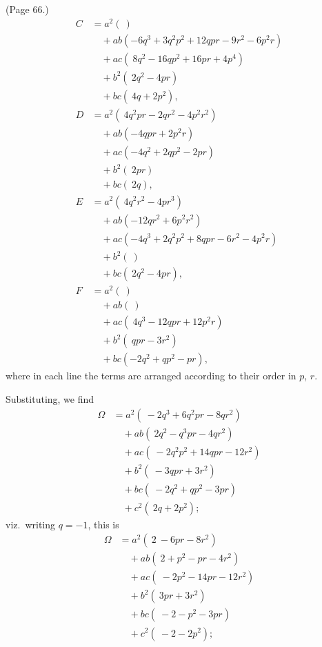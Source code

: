 \documentclass[11pt,a4paper]{article}
\begin{document}
\noindent (Page 66.)
\begin{align*}
C &= a^2 (\ ) \\
 &\quad + ab(-6q^3 + 3q^2 p^2 + 12qpr - 9r^2 - 6p^2 r) \\
 &\quad + ac(\ 8q^2 - 16qp^2 + 16pr + 4p^4) \\
 &\quad + b^2 (\ 2q^2 - 4pr) \\
 &\quad + bc(\ 4q + 2p^2), \\[4pt]
D &= a^2 (\ 4q^2 pr - 2qr^2 - 4p^2 r^2) \\
 &\quad + ab(-4qpr + 2p^2 r) \\
 &\quad + ac(-4q^2 + 2qp^2 - 2pr) \\
 &\quad + b^2 (\ 2pr) \\
 &\quad + bc(\ 2q), \\[4pt]
E &= a^2 (\ 4q^2 r^2 - 4pr^3) \\
 &\quad + ab(-12qr^2 + 6p^2 r^2) \\
 &\quad + ac(-4q^3 + 2q^2 p^2 + 8qpr - 6r^2 - 4p^2 r) \\
 &\quad + b^2 (\ ) \\
 &\quad + bc(\ 2q^2 - 4pr), \\[4pt]
F &= a^2 (\ ) \\
 &\quad + ab(\ ) \\
 &\quad + ac(\ 4q^3 - 12qpr + 12p^2 r) \\
 &\quad + b^2 (\ qpr - 3r^2) \\
 &\quad + bc(-2q^2 + qp^2 - pr),
\end{align*}
where in each line the terms are arranged according to their order in $p$, $r$.

Substituting, we find
\begin{align*}
\Omega &= a^2 (\ -2q^3 + 6q^2 pr - 8qr^2) \\
 &\quad + ab(\ 2q^2 - q^3 pr - 4qr^2) \\
 &\quad + ac(\ -2q^2 p^2 + 14qpr - 12r^2) \\
 &\quad + b^2 (\ -3qpr + 3r^2) \\
 &\quad + bc(\ -2q^2 + qp^2 - 3pr) \\
 &\quad + c^2 (\ 2q + 2p^2);
\end{align*}
viz.\ writing $q = -1$, this is
\begin{align*}
\Omega &= a^2 (\ 2\ -6pr - 8r^2) \\
 &\quad + ab(\ 2 + p^2 - pr - 4r^2) \\
 &\quad + ac(\ -2p^2 - 14pr - 12r^2) \\
 &\quad + b^2 (\ 3pr + 3r^2) \\
 &\quad + bc(\ -2 - p^2 - 3pr) \\
 &\quad + c^2 (\ -2 - 2p^2);
\end{align*}
\end{document}
